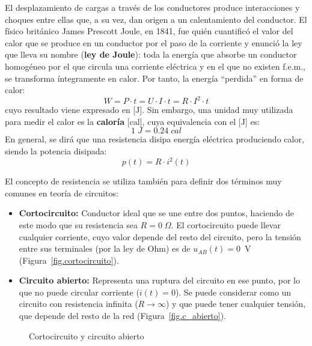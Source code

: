 	El desplazamiento de cargas a través de los conductores produce interacciones y choques entre ellas que, a su vez, dan
	origen a un calentamiento del conductor. El físico británico James Prescott Joule, en 1841, fue quién cuantificó el valor del calor que se produce en un conductor por el paso de la corriente y enunció la ley que lleva su nombre (\textbf{ley de Joule}): toda la energía que absorbe un conductor homogéneo por el que circula una corriente eléctrica y en el que no existen f.e.m., se transforma íntegramente en calor. Por tanto, la energía ``perdida'' en forma de calor:
	\begin{equation*}
		W=P\cdot t=U\cdot I\cdot t=R\cdot I^2\cdot t
	\end{equation*}
	cuyo resultado viene expresado en [J]. Sin embargo, una unidad muy utilizada para medir el calor es la \textbf{caloría} [cal], cuya equivalencia con el [J] es:
	\begin{equation*}
		1\;J=0.24\;cal
	\end{equation*}
	En general, se dirá que una resistencia disipa energía eléctrica produciendo calor, siendo la potencia disipada: 
	\begin{equation*}
		p(t)=R\cdot i^{2}(t)
	\end{equation*}
	
	El concepto de resistencia se utiliza también para definir dos términos muy comunes en teoría de circuitos:
	\begin{itemize}
		\item \textbf{Cortocircuito:} Conductor ideal que se une entre dos puntos, haciendo de este modo que su resistencia sea $R=0\;\Omega$. El cortocircuito puede llevar cualquier corriente, cuyo valor depende del resto del circuito, pero la tensión entre sus terminales (por la ley de Ohm) es de $u_{AB}(t)=0$~V (Figura~\ref{fig.cortocircuito}). 
		\item \textbf{Circuito abierto:} Representa una ruptura del circuito en ese punto, por lo que no puede circular corriente ($i(t)=0$). Se puede considerar como un circuito con resistencia infinita ($R\rightarrow\infty$) y que puede tener cualquier tensión, que depende del resto de la red (Figura~\ref{fig.c_abierto}).
	\end{itemize}
	\begin{figure}[H]
		\centering
		\hfil
		\caption{Cortocircuito y circuito abierto}
		
	\end{figure}
	
